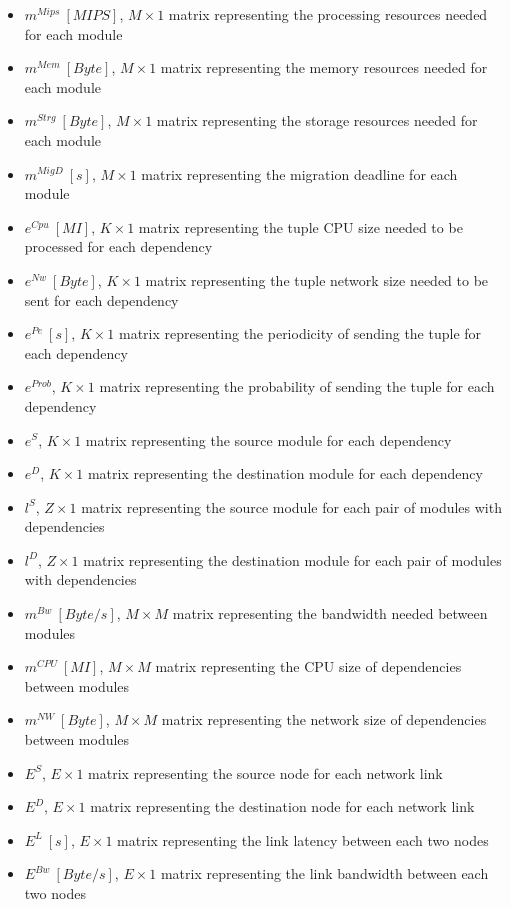 \documentclass{article}
\begin{document}
\begin{itemize}
	\item $m^{Mips}~[MIPS]$, $M\times 1$ matrix representing the processing resources needed for each module
	\item $m^{Mem}~[Byte]$, $M\times 1$ matrix representing the memory resources needed for each module
	\item $m^{Strg}~[Byte]$, $M\times 1$ matrix representing the storage resources needed for each module
	\item $m^{MigD}~[s]$, $M\times 1$ matrix representing the migration deadline for each module\\
	
	\item $e^{Cpu}~[MI]$, $K\times 1$ matrix representing the tuple CPU size needed to be processed for each dependency
	\item $e^{Nw}~[Byte]$, $K\times 1$ matrix representing the tuple network size needed to be sent for each dependency
	\item $e^{Pe}~[s]$, $K\times 1$ matrix representing the periodicity of sending the tuple for each dependency
	\item $e^{Prob}$, $K\times 1$ matrix representing the probability of sending the tuple for each dependency
	\item $e^{S}$, $K\times 1$ matrix representing the source module for each dependency
	\item $e^{D}$, $K\times 1$ matrix representing the destination module for each dependency\\
	
	\item $l^S$, $Z\times 1$ matrix representing the source module for each pair of modules with dependencies
	\item $l^D$, $Z\times 1$ matrix representing the destination module for each pair of modules with dependencies\\
	
	\item $m^{Bw}~[Byte/s]$, $M\times M$ matrix representing the bandwidth needed between modules
	\item $m^{CPU}~[MI]$, $M\times M$ matrix representing the CPU size of dependencies between modules
	\item $m^{NW}~[Byte]$, $M\times M$ matrix representing the network size of dependencies between modules\\
	
	\item $E^S$, $E\times 1$ matrix representing the source node for each network link
	\item $E^D$, $E\times 1$ matrix representing the destination node for each network link
	\item $E^L~[s]$, $E\times 1$ matrix representing the link latency between each two nodes
	\item $E^{Bw}~[Byte/s]$, $E\times 1$ matrix representing the link bandwidth between each two nodes\\
	

\end{itemize}
\end{document}
